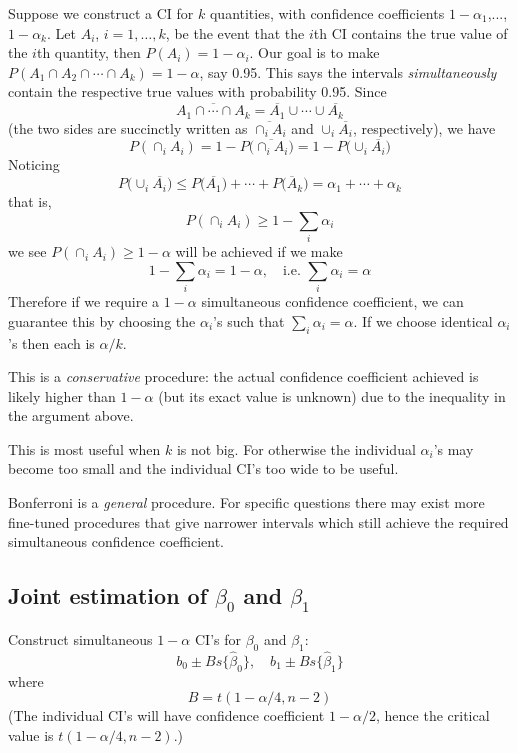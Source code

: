 \documentclass[12pt]{article}
\begin{document}
Suppose we construct a CI for $k$ quantities,
with confidence coefficients $1 - \alpha_1$,..., $1 - \alpha_k$.
Let $A_i$, $i = 1, \dotsc, k$, be the event that the $i$th CI contains
the true value of the $i$th quantity,
then $P(A_i) = 1 - \alpha_i$.
Our goal is to make
$P(A_1 \cap A_2 \cap \dotsb \cap A_k) = 1 - \alpha$,
say 0.95.
This says the intervals \emph{simultaneously}
contain the respective true values with probability 0.95.
Since
\[
\overline{A_1 \cap \dotsb \cap A_k}
= \overline{A_1} \cup \dotsb \cup \overline{A_k}
\]
(the two sides are succinctly written as
$\overline{\cap_i A_i}$ and $\cup_i \overline{A_i}$,
respectively),
we have
\[
P(\cap_i A_i)
= 1 - P\bigl(\overline{\cap_i A_i}\bigr)
= 1 - P\bigl(\cup_i \overline{A_i}\bigr)
\]
Noticing
\[
P\bigl(\cup_i \overline{A_i}\bigr)
\le P\bigl(\overline{A_1}\bigr) + \dotsb + P\bigl(\overline{A}_k\bigr)
= \alpha_1 + \dotsb + \alpha_k
\]
that is,
\[
P(\cap_i A_i) \ge 1 - \sum_i \alpha_i
\]
we see
$P(\cap_i A_i) \ge 1 - \alpha$ will be
achieved if we make
\[
1 - \sum_i \alpha_i = 1 - \alpha
,\quad\text{i.e. }
\sum_i \alpha_i = \alpha
\]
Therefore if we require a $1 - \alpha$ simultaneous confidence
coefficient, we can guarantee this by choosing the $\alpha_i$'s
such that $\sum_i \alpha_i = \alpha$.
If we choose identical $\alpha_i$'s then each is $\alpha/k$.

This is a \emph{conservative} procedure:
the actual confidence coefficient achieved is
likely higher than $1 - \alpha$ (but its exact value is unknown)
due to the inequality in the argument above.

This is most useful when $k$ is not big.
For otherwise the individual $\alpha_i$'s may become too small
and the individual CI's too wide to be useful.

Bonferroni is a \emph{general} procedure.
For specific questions there may exist more fine-tuned procedures that
give narrower intervals which still achieve the required simultaneous confidence
coefficient.

\subsection{Joint estimation of $\beta_0$ and $\beta_1$}

Construct simultaneous $1 - \alpha$ CI's for $\beta_0$ and $\beta_1$:
\[
b_0 \pm B s\{\hat\beta_0\},
\quad
b_1 \pm B s\{\hat\beta_1\}
\]
where
\[
B = t(1 - \alpha/4, n - 2)
\]
(The individual CI's will have confidence coefficient $1 - \alpha/2$,
hence the critical value is $t(1 - \alpha/4, n-2)$.)
\end{document}
